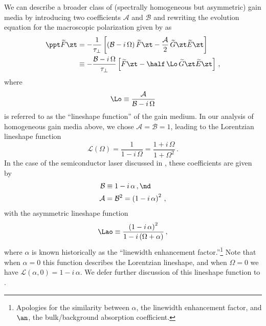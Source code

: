 We can describe a broader class of (spectrally homogeneous but asymmetric) gain media by introducing two coefficients $\mathcal{A}$ and $\mathcal{B}$ and rewriting the evolution equation for the macroscopic polarization given by  as
\begin{equation} \label{eqn:cw_sml_ftz_scaled}
  \begin{split}
    \ppt \widetilde{F}\zt &= -\frac{1}{\tau_\perp} \left[ \left(\mathcal{B} - i\, \Omega\right) \widetilde{F}\zt - \frac{\mathcal{A}}{2}\, \widetilde{G}\zt \widetilde{E}\zt \right] \\
    &\equiv -\frac{\mathcal{B} - i\, \Omega}{\tau_\perp} \left[ \widetilde{F}\zt - \half\, \Lo\, \widetilde{G}\zt \widetilde{E}\zt \right]\, ,
  \end{split}
\end{equation}
where
\begin{equation} \label{eqn:lineshape_general}
  \Lo \equiv \frac{\mathcal{A}}{\mathcal{B} - i\, \Omega}
\end{equation}
is referred to as the ``lineshape function'' of the gain medium. In our analysis of homogeneous gain media above, we chose $\mathcal{A} = \mathcal{B} = 1$, leading to the Lorentzian lineshape function
\begin{equation} \label{eqn:lineshape_lorentzian}
  \mathcal{L}(\Omega) = \frac{1}{1 - i\, \Omega} = \frac{1 + i\, \Omega}{1 + \Omega^2}\, .
\end{equation}
In the case of the semiconductor laser discussed in , these coefficients are given by~\cite{ref:columbo2018dbq}
\begin{subequations}
  \begin{align}
    \mathcal{B} &\equiv 1 - i\, \alpha\, , \nd \\
    \mathcal{A} &= \mathcal{B}^2 = \left(1 - i\, \alpha\right)^2 \, ,
  \end{align}
\end{subequations}
with the asymmetric lineshape function
\begin{equation} \label{eqn:laser_statics_1d_lef_lineshape}
  \Lao \equiv \frac{\left(1 - i\, \alpha\right)^2}{1 - i\, (\Omega + \alpha)} \, ,
\end{equation}
where $\alpha$ is known historically as the ``linewidth enhancement factor.''\footnote{Apologies for the similarity between $\alpha$, the linewidth enhancement factor, and $\an$, the bulk/background absorption coefficient.} Note that when $\alpha = 0$ this function describes the Lorentzian lineshape, and when $\Omega = 0$ we have $\mathcal{L}(\alpha, 0) = 1 - i\, \alpha$. We defer further discussion of this lineshape function to .

